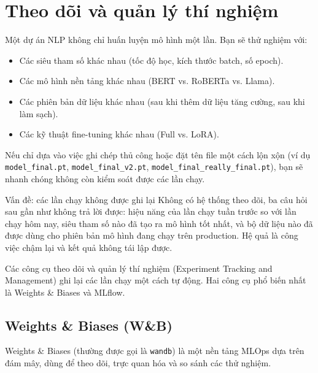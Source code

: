 
\section{Theo dõi và quản lý thí nghiệm}
\label{sec:experiment_tracking}

Một dự án NLP không chỉ huấn luyện mô hình một lần. Bạn sẽ thử nghiệm với:
\begin{itemize}
    \item Các siêu tham số khác nhau (tốc độ học, kích thước batch, số epoch).
    \item Các mô hình nền tảng khác nhau (BERT vs. RoBERTa vs. Llama).
    \item Các phiên bản dữ liệu khác nhau (sau khi thêm dữ liệu tăng cường, sau khi làm sạch).
    \item Các kỹ thuật fine-tuning khác nhau (Full vs. LoRA).
\end{itemize}

Nếu chỉ dựa vào việc ghi chép thủ công hoặc đặt tên file một cách lộn xộn (ví dụ \texttt{model\_final.pt}, \texttt{model\_final\_v2.pt}, \texttt{model\_\allowbreak final\_\allowbreak really\_\allowbreak final.\allowbreak pt}), bạn sẽ nhanh chóng không còn kiểm soát được các lần chạy.

\begin{pitfall}{Vấn đề: các lần chạy không được ghi lại}
Không có hệ thống theo dõi, ba câu hỏi sau gần như không trả lời được: hiệu năng của lần chạy tuần trước so với lần chạy hôm nay, siêu tham số nào đã tạo ra mô hình tốt nhất, và bộ dữ liệu nào đã được dùng cho phiên bản mô hình đang chạy trên production. Hệ quả là công việc chậm lại và kết quả không tái lập được.
\end{pitfall}

Các công cụ theo dõi và quản lý thí nghiệm (Experiment Tracking and Management) ghi lại các lần chạy một cách tự động. Hai công cụ phổ biến nhất là Weights \& Biases và MLflow.

\subsection{Weights \& Biases (W\&B)}
\label{ssec:wandb}
Weights \& Biases (thường được gọi là \texttt{wandb}) là một nền tảng MLOps dựa trên đám mây, dùng để theo dõi, trực quan hóa và so sánh các thử nghiệm.

\begin{center}
\label{fig:wandb_dashboard}
\end{center}


